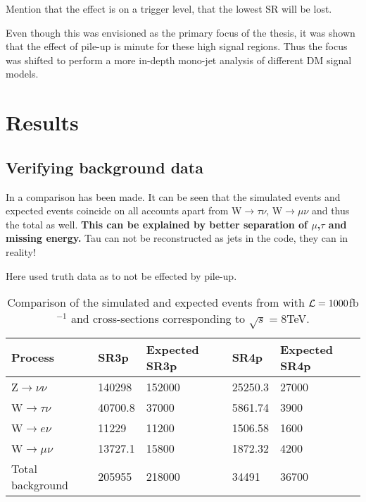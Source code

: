 Mention that the effect is on a trigger level, that the lowest SR will be lost.

Even though this was envisioned as the primary focus of the thesis, it was shown that the effect of pile-up is minute for these high signal regions. Thus the focus was shifted to perform a more in-depth mono-jet analysis of different DM signal models.
\newpage
\section{Results}
\subsection{Verifying background data}\label{Verifying background data}
In  a comparison has been made. It can be seen that the simulated events and expected events coincide on all accounts apart from W$\rightarrow\tau\nu$, W$\rightarrow\mu\nu$ and thus the total as well. \textbf{This can be explained by better separation of $\mu$,$\tau$ and missing energy.} 
Tau can not be reconstructed as jets in the code, they can in reality!

Here used truth data as to not be effected by pile-up.

\begin{table}[ht]
\begin{center}
\begin{tabular}{|l|l|l|l|l|}
\hline
Process & SR3p & Expected SR3p & SR4p  & Expected SR4p \\ \hline
Z$\rightarrow\nu\nu$&140298&152000&25250.3&27000 \\
W$\rightarrow\tau\nu$&40700.8&37000&5861.74&3900 \\
W$\rightarrow e\nu$&11229&11200&1506.58&1600 \\
W$\rightarrow\mu\nu$&13727.1&15800&1872.32&4200 \\ \hline
Total background&205955&218000&34491&36700 \\ \hline
\end{tabular}
\caption{Comparison of the simulated and expected events from \citep{ATLAS-CONF-2012-147} with $\mathcal{L}=1000$fb$^{-1}$ and cross-sections corresponding to $\sqrt{s}=8$TeV.}
\label{tab:Compare1}
\end{center}
\end{table}

